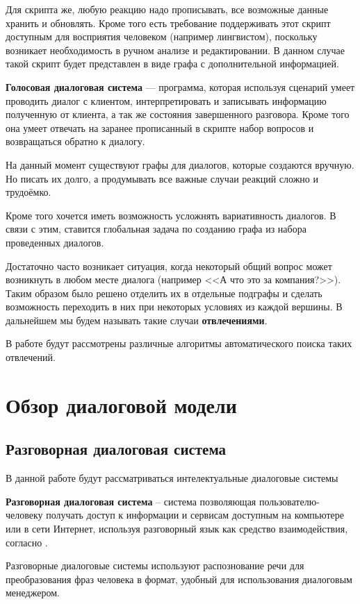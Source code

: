 \documentclass[specification,annotation]{itmo-student-thesis}
\begin{document}
	Для скрипта же, любую реакцию надо прописывать, все возможные данные хранить и обновлять. Кроме того есть требование поддерживать этот скрипт доступным для восприятия человеком (например лингвистом), поскольку возникает необходимость в ручном анализе и редактировании. В данном случае такой скрипт будет представлен в виде графа с дополнительной информацией.
	
	\textbf{Голосовая диалоговая система} — программа, которая используя сценарий умеет проводить диалог с клиентом, интерпретировать и записывать  информацию полученную от клиента, а так же состояния завершенного разговора. Кроме того она умеет отвечать на заранее прописанный в скрипте набор вопросов и возвращаться обратно к диалогу.
	
	На данный момент существуют графы для диалогов, которые создаются вручную. Но писать их долго, а продумывать все важные случаи реакций сложно и трудоёмко. 
	
	Кроме того хочется иметь возможность усложнять вариативность диалогов. В связи с этим, ставится глобальная задача по созданию графа из набора проведенных диалогов. 
	
	Достаточно часто возникает ситуация, когда некоторый общий вопрос может возникнуть в любом месте диалога (например <<А что это за компания?>>). Таким образом было решено отделить их в отдельные подграфы и сделать возможность переходить в них при некоторых условиях из каждой вершины. В дальнейшем мы будем называть такие случаи \textbf{отвлечениями}.
	
	В работе будут рассмотрены различные алгоритмы автоматического поиска таких отвлечений.
	
	\chapter{Обзор диалоговой модели}
	\section{Разговорная диалоговая система}
	В данной работе будут рассматриваться интелектуальные диалоговые системы
	
	\textbf{Разговорная диалоговая система} -- система позволяющая пользователю-человеку получать доступ к информации и сервисам доступным на компьютере или в сети Интернет, используя разговорный язык как средство взаимодействия, согласно \cite{jokinen2010spoken}.
	
	Разговорные диалоговые системы используют распознование речи для преобразования фраз человека в формат, удобный для использования диалоговым менеджером.
	
\end{document}
